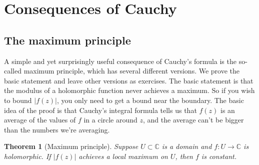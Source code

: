 \documentclass[12pt,openany]{book}
\newcommand{\sabs}[1]{\lvert {#1} \rvert}
\newcommand{\C}{{\mathbb{C}}}
\theoremstyle{plain}
\newtheorem{thm}{Theorem}[section]
\theoremstyle{remark}
\theoremstyle{definition}
\theoremstyle{exercise}
\theoremstyle{example}
\begin{document}

\section{Consequences of Cauchy}
\label{sec:consequencescauchy}

\subsection{The maximum principle}

A simple and yet surprisingly useful consequence of Cauchy's formula is the
so-called maximum principle, which has several different versions.
We prove the basic statement and leave other versions as exercises.
The basic statement is that the modulus of a holomorphic function never
achieves a maximum.  So if you wish to bound $\sabs{f(z)}$, you only need to
get a bound near the boundary.
The basic idea of the proof is that Cauchy's integral formula tells us that
$f(z)$ is an average of the values of $f$ in a circle around $z$, and the
average can't be bigger than the numbers we're averaging.

\begin{thm}[Maximum principle]
%
Suppose $U \subset \C$ is a domain and
$f \colon U \to \C$ is holomorphic.
If $\sabs{f(z)}$ achieves a local maximum on $U$, then $f$ is constant.
\end{thm}
\end{document}

